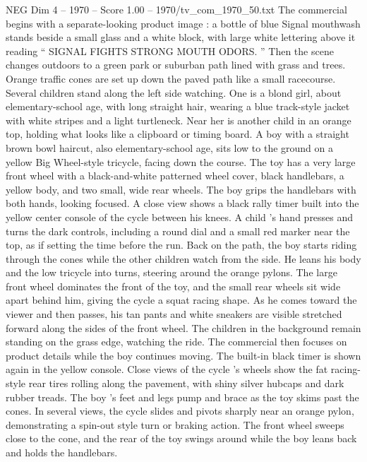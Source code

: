 \begin{textsample}{NEG Dim 4 – 1970 – Score 1.00 – 1970/tv\_com\_1970\_50.txt}  \label{ex:f4_neg_008}
The commercial begins with a separate-looking product image : a bottle of blue Signal mouthwash stands beside a small glass and a white block, with large white lettering above it reading “ SIGNAL FIGHTS STRONG MOUTH ODORS. ” Then the scene changes outdoors to a green park or suburban path lined with grass and trees.
Orange traffic cones are set up down the paved path like a small racecourse.
Several children stand along the left side watching.
One is a blond girl, about elementary-school age, with long straight hair, wearing a blue track-style jacket with white stripes and a light turtleneck.
Near her is another child in an orange top, holding what looks like a clipboard or timing board.
A boy with a straight brown bowl haircut, also elementary-school age, sits low to the ground on a yellow Big Wheel-style tricycle, facing down the course.
The toy has a very large front wheel with a black-and-white patterned wheel cover, black handlebars, a yellow body, and two small, wide rear wheels.
The boy grips the handlebars with both hands, looking focused.
A close view shows a black rally timer built into the yellow center console of the cycle between his knees.
A child ’s hand presses and turns the dark controls, including a round dial and a small red marker near the top, as if setting the time before the run.
Back on the path, the boy starts riding through the cones while the other children watch from the side.
He leans his body and the low tricycle into turns, steering around the orange pylons.
The large front wheel dominates the front of the toy, and the small rear wheels sit wide apart behind him, giving the cycle a squat racing shape.
As he comes toward the viewer and then passes, his tan pants and white sneakers are visible stretched forward along the sides of the front wheel.
The children in the background remain standing on the grass edge, watching the ride.
The commercial then focuses on product details while the boy continues moving.
The built-in black timer is shown again in the yellow console.
Close views of the cycle ’s wheels show the fat racing-style rear tires rolling along the pavement, with shiny silver hubcaps and dark rubber treads.
The boy ’s feet and legs pump and brace as the toy skims past the cones.
In several views, the cycle slides and pivots sharply near an orange pylon, demonstrating a spin-out style turn or braking action.
The front wheel sweeps close to the cone, and the rear of the toy swings around while the boy leans back and holds the handlebars.

\end{textsample}
